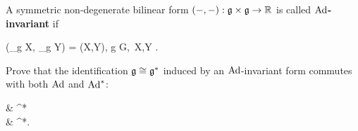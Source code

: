 \begin{definition}
	A symmetric non-degenerate bilinear form $(-,-) : \mathfrak g \times \mathfrak g \to \mathbb{R}$ is called \textbf{$\operatorname{Ad}$-invariant} if
	\begin{eqalign}
		(\Ad_g X, \Ad_g Y) = (X,Y), \quad \forall g \in G,\, \forall X,Y \in \lalg.
	\end{eqalign}
\end{definition}

\begin{exercise}
	Prove that the identification $\mathfrak g \overset{}{\cong} \mathfrak g^*$ induced by an $\operatorname{Ad}$-invariant form commutes with both $\operatorname{Ad}$ and $\operatorname{Ad}^*$:
	\begin{diagram}
		\lalg {}  \& \lalg^* \\
		\lalg {} \& \lalg^*.
	\end{diagram}
\end{exercise}

